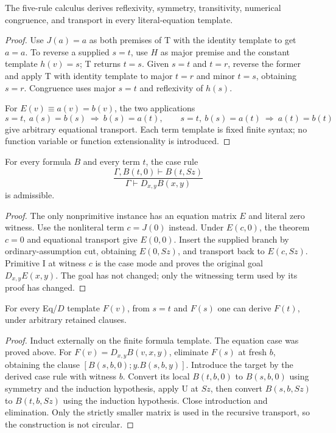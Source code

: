 \begin{lemma}
The five-rule calculus derives reflexivity, symmetry, transitivity,
numerical congruence, and transport in every literal-equation template.
\end{lemma}
\begin{proof}
Use $J(a)=a$ as both premises of T with the identity template to get
$a=a$. To reverse a supplied $s=t$, use $H$ as major premise and the
constant template $h(v)=s$; T returns $t=s$. Given $s=t$ and $t=r$,
reverse the former and apply T with identity template to major $t=r$
and minor $t=s$, obtaining $s=r$. Congruence uses major $s=t$ and
reflexivity of $h(s)$.

For $E(v)\equiv a(v)=b(v)$, the two applications
\[
 s=t,\ a(s)=b(s)\ \Longrightarrow\ b(s)=a(t),
 \qquad
 s=t,\ b(s)=a(t)\ \Longrightarrow\ a(t)=b(t)
\]
give arbitrary equational transport. Each term template is fixed finite
syntax; no function variable or function extensionality is introduced.
\end{proof}

\begin{lemma}
For every formula $B$ and every term $t$, the case rule
\[
 \frac{\Gamma,B(t,0)\vdash B(t,Sz)}
      {\Gamma\vdash D_{x,y}B(x,y)}
\]
is admissible.
\end{lemma}
\begin{proof}
The only nonprimitive instance has an equation matrix $E$ and literal
zero witness. Use the nonliteral term $c=J(0)$ instead. Under $E(c,0)$,
the theorem $c=0$ and equational transport give $E(0,0)$. Insert the
supplied branch by ordinary-assumption cut, obtaining $E(0,Sz)$, and
transport back to $E(c,Sz)$. Primitive I at witness $c$ is the case mode
and proves the original goal $D_{x,y}E(x,y)$. The goal has not changed;
only the witnessing term used by its proof has changed.
\end{proof}

\begin{lemma}
For every Eq/$D$ template $F(v)$, from $s=t$ and $F(s)$ one can derive
$F(t)$, under arbitrary retained clauses.
\end{lemma}
\begin{proof}
Induct externally on the finite formula template. The equation case was
proved above. For $F(v)=D_{x,y}B(v,x,y)$, eliminate $F(s)$ at fresh $b$,
obtaining the clause $[B(s,b,0);y.B(s,b,y)]$. Introduce the target by the
derived case rule with witness $b$. Convert its local $B(t,b,0)$ to
$B(s,b,0)$ using symmetry and the induction hypothesis, apply U at $Sz$,
then convert $B(s,b,Sz)$ to $B(t,b,Sz)$ using the induction hypothesis.
Close introduction and elimination. Only the strictly smaller matrix is
used in the recursive transport, so the construction is not circular.
\end{proof}

